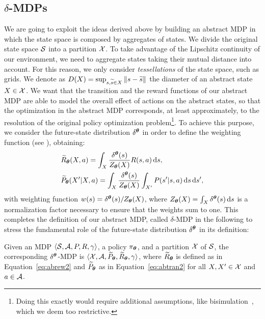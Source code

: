 \subsection{$\delta$-\ac{MDPs}}
We are going to exploit the ideas derived above by building an abstract \ac{MDP} in which the state space is composed by aggregates of states. We divide the original state space $\mathcal{S}$ into a partition $\mathcal{X}$. To take advantage of the Lipschitz continuity of our environment, we need to aggregate states taking their mutual distance into account. For this reason, we only consider \textit{tessellations} of the state space, such as grids. 
%
We denote as $D(X) = \sup_{s,\widetilde{s}\in X}\left\|s-\widetilde{s}\right\|_{}$ the diameter of an abstract state $X\in\mathcal{X}$.
We want that the transition and the reward functions of our abstract MDP are able to model the overall effect of actions on the abstract states, so that the optimization in the abstract MDP corresponds, at least approximately, to the resolution of the original policy optimization problem\footnote{Doing this exactly would require additional assumptions, like bisimulation~\citep{givan2003equivalence}, which we deem too restrictive.}. To achieve this purpose, we consider the future-state distribution $\delta^{\boldsymbol{\theta}}$ in order to define the weighting function (see ), obtaining:
%
\begin{align}
	&\widetilde{R}_{\boldsymbol{\theta}}(X,a) = \int_{X}\frac{\delta^{\boldsymbol{\theta}}(s)}{Z_{\boldsymbol{\theta}}(X)}R(s,a)\,\mathrm{d} s,\label{eq:abrew2} \\
	&\widetilde{P}_{\boldsymbol{\theta}}(X'|X,a) = \int_{X} \frac{\delta^{\boldsymbol{\theta}}(s)}{Z_{\boldsymbol{\theta}}(X)} \int_{X'} P(s'|s,a)\,\mathrm{d} s\,\mathrm{d} s',\label{eq:abtran2}
\end{align}
%
with weighting function $w(s)=\delta^{\boldsymbol{\theta}}(s)/Z_{\boldsymbol{\theta}}(X)$, where $Z_{\boldsymbol{\theta}}(X)=\int_{X}\delta^{\boldsymbol{\theta}}(s)\,\mathrm{d} s$ is a normalization factor necessary to ensure that the weights sum to one.
This completes the definition of our abstract \ac{MDP}, called $\delta$-MDP in the following to stress the fundamental role of the future-state distribution $\delta^{\boldsymbol{\theta}}$ in its definition:
%
\begin{definition}\label{def:abmdp}
	Given an MDP $\langle\mathcal{S}, \mathcal{A}, P, R, \gamma\rangle$, a policy $\pi_{\boldsymbol{\theta}}$, and a partition $\mathcal{X}$ of $\mathcal{S}$, the corresponding $\delta^{\boldsymbol{\theta}}$-MDP is $\langle\mathcal{X}, \mathcal{A}, \widetilde{P}_{\boldsymbol{\theta}}, \widetilde{R}_{\boldsymbol{\theta}}, \gamma\rangle$, where $\widetilde{R}_{\boldsymbol{\theta}}$ is defined as in Equation~\eqref{eq:abrew2} and $\widetilde{P}_{\boldsymbol{\theta}}$ as in Equation~\eqref{eq:abtran2} for all $X,X'\in\mathcal{X}$ and $a\in\mathcal{A}$.
\end{definition}

